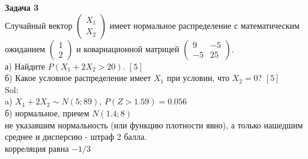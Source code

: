 \documentclass[pdftex,12pt,a4paper]{article}
\begin{document}
\textbf{Задача 3} \\ %
Случайный вектор  $\left(\begin{array}{c}
{X_{1} } \\ {X_{2} }
\end{array}\right)$  имеет нормальное распределение с
математическим ожиданием  $\left(\begin{array}{c} {1} \\ {2}
\end{array}\right)$  и ковариационной матрицей
$\left(\begin{array}{cc} {9} & {-5} \\ {-5} & {25}
\end{array}\right)$. \\
а) Найдите  $P\left(X_{1} +2X_{2} >20\right)$. $[5]$ \\
б) Какое условное распределение имеет $X_{1}$ при условии, что $X_{2}=0$? $[5]$ \\
Sol: \\
a) $X_{1}+2X_{2}\sim N(5;89)$, $P(Z>1.59)=0.056$ \\
б) нормальное, причем $N(1.4;8)$ \\
не указавшим нормальность (или функцию плотности явно), а только нашедшим среднее и дисперсию - штраф 2 балла. \\
корреляция равна $-1/3$ \\




\end{document}
